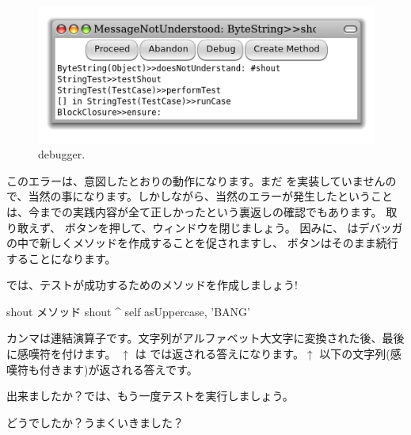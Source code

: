 \documentclass[a4paper,10pt,twoside]{book}
\begin{document}
{{{\begin{figure}[hbt]
\centerline {\includegraphics[width=\textwidth]{Predebugger}}
\caption{debugger.}
\end{figure}

このエラーは、意図したとおりの動作になります。まだ  を実装していませんので、当然の事になります。しかしながら、当然のエラーが発生したということは、今までの実践内容が全て正しかったという裏返しの確認でもあります。
取り敢えず、 ボタンを押して、ウィンドウを閉じましょう。
因みに、 はデバッガの中で新しくメソッドを作成することを促されますし、 ボタンはそのまま続行することになります。

では、テストが成功するためのメソッドを作成しましょう!

\begin{method}[shout]{shout メソッド}
shout
	^ self asUppercase, 'BANG'
\end{method}

カンマは連結演算子です。文字列がアルファベット大文字に変換された後、最後に感嘆符を付けます。
$\uparrow$ は \pharo では返される答えになります。$\uparrow$ 以下の文字列(感嘆符も付きます)が返される答えです。

出来ましたか？では、もう一度テストを実行しましょう。

どうでしたか？うまくいきました？


}}}
\end{document}
